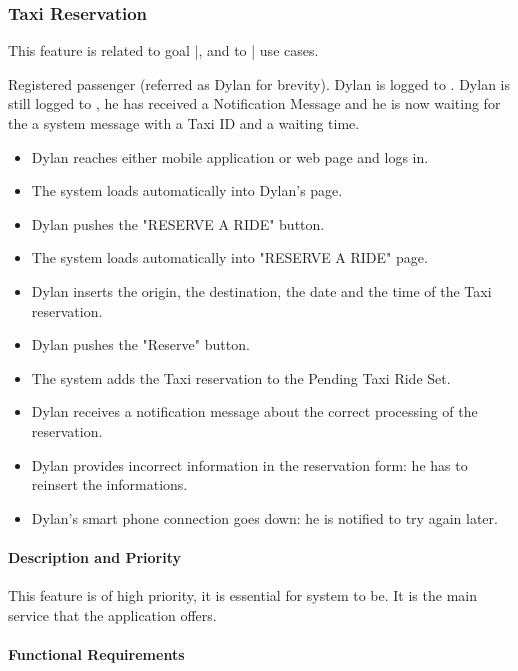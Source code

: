 \subsubsection{Taxi Reservation}
This feature is related to goal |, and to | use cases.
\begin{itemize}
	 Registered passenger (referred as Dylan for brevity).
	 Dylan is logged to \myTaxiService{}.
	 Dylan is still logged to \myTaxiService{}, he has received a Notification Message and he is now waiting for the a system message with a Taxi ID and a waiting time.
	\begin{itemize}
		\item Dylan reaches either \myTaxiService{} mobile application or web page and logs in.
		\item The system loads automatically into Dylan's page.
		\item Dylan pushes the "RESERVE A RIDE" button.
		\item The system loads automatically into "RESERVE A RIDE" page.
		\item Dylan inserts the origin, the destination, the date and the time of the Taxi reservation.
		\item Dylan pushes the "Reserve" button.
		\item The system adds the Taxi reservation to the Pending Taxi Ride Set.
		\item Dylan receives a notification message about the correct processing of the reservation. 
	\end{itemize}
	\begin{itemize}
		\item Dylan provides incorrect information in the reservation form: he has to reinsert the informations.
		\item Dylan's smart phone connection goes down: he is notified to try again later.  
	\end{itemize}
\end{itemize}
\paragraph{Description and Priority}
This feature is of high priority, it is essential for \myTaxiService{} system to be. It is the main service that the application offers.
\paragraph{Functional Requirements}
\begin{itemize}
\end{itemize}
